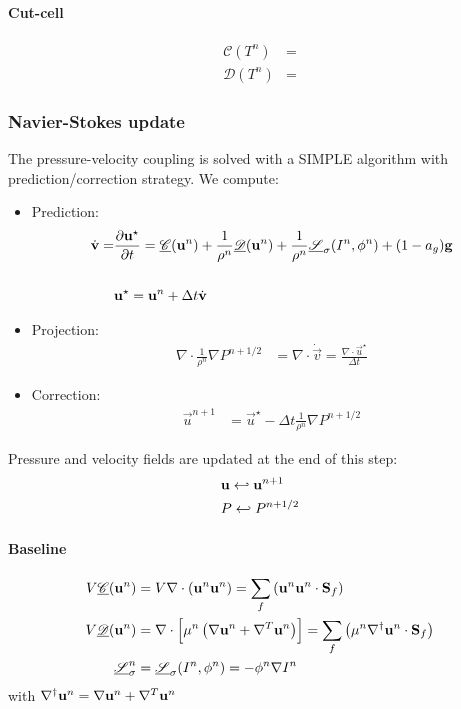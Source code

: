 \documentclass[]{article}
\begin{document}
\paragraph{Cut-cell}
\begin{align}
	\mathcal{C}(T^{n}) &= \\
	\mathcal{D}(T^{n}) &= 
\end{align}

\subsubsection{Navier-Stokes update}
The pressure-velocity coupling is solved with a SIMPLE algorithm with prediction/correction strategy. 
We compute: 
\begin{itemize}
	\item Prediction:
	\begin{align}
		\dot{\vec{v}}=&\pard{\vec{u}^\star }{t}= \underline{\mathcal{C}}(\ve{u}^{n})
			+\frac{1}{\rho^n}\underline{\mathcal{D}}(\ve{u}^{n})
			+\frac{1}{\rho^n}\underline{\mathcal{S}}_\sigma(I^n, \phi^n)
			+(1-a_g) \vec{g} \nonumber \\
		&\code{  --> ns_->derivee_en_temps_inco(d_velocity_);} \\
		&\vec{u}^\star = \vec{u}^n + \Delta t \dot{\vec{v}}
	\end{align}
	\item Projection:
	\begin{align}
		\nabla \cdot \frac{1}{\rho^n} \nabla P^{n+1/2} &= \nabla \cdot \dot{\vec{v}} =\frac{\nabla \cdot \vec{u}^\star}{\Delta t}
	\end{align}
	\item Correction:
	\begin{align}
\vec{u}^{n+1} &= \vec{u}^\star - \Delta t \frac{1}{\rho^n}\nabla P^{n+1/2}
	\end{align}
\end{itemize}

Pressure and velocity fields are updated at the end of this step:
\begin{align} 
	&\vec{u} \into \vec{u}^{n+1} \\
	&P \into P^{n+1/2} 
\end{align}

\paragraph{Baseline}
\begin{align}
	V\underline{\mathcal{C}}(\ve{u}^{n}) &= V\nabla \cdot \lrp{\ve{u}^n\ve{u}^n}=\sum_f \lrp{\ve{u}^n \ve{u}^n \cdot\ve{S}_f}\\
	V\underline{\mathcal{D}}(\ve{u}^{n}) &= 
	\nabla \cdot \lrb{\vphantom{\sum}\mu^n \lrp{\nabla \vec{u}^n + \nabla^T \vec{u}^n }}
	=\sum_f \lrp{\mu^n \nabla^\dagger \ve{u}^n\cdot\ve{S}_f} \\
	\underline{\mathcal{S}}_\sigma^n &=\underline{\mathcal{S}}_\sigma(I^n, \phi^n)= -\phi^n \nabla I^n  
\end{align}
with $\nabla^\dagger \ve{u}^n=\nabla \ve{u}^n+\nabla^T \ve{u}^n$
\end{document}
